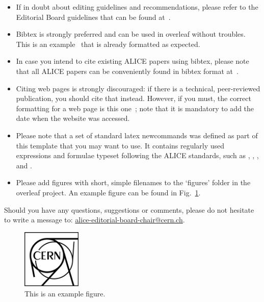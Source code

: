 \documentclass[ALICE,manyauthors]{cernphprep}
\begin{document}
\begin{itemize}
\item If in doubt about editing guidelines and recommendations, please refer to the Editorial Board guidelines that can be found at~\cite{EBGuidelineEditing}.
\item Bibtex is strongly preferred and can be used in overleaf without troubles. This is an example~\cite{Acharya:2018ckj} that is already formatted as expected.
\item In case you intend to cite existing ALICE papers using bibtex, please note that all ALICE papers can be conveniently found in bibtex format at~\cite{ALICEpubpapers}.
\item Citing web pages is strongly discouraged: if there is a technical, peer-reviewed publication, you should cite that instead. However, if you must, the correct formatting for a web page is this one~\cite{CERNpage}; note that it is mandatory to add the date when the website was accessed.  
\item Please note that a set of standard latex newcommands was defined as part of this template that you may want to use. It contains regularly used expressions and formulae typeset following the ALICE standards, such as \pt, \kzero, \fivenn,  and \avdndeta.
\item Please add figures with short, simple filenames to the `figures' folder in the overleaf project. An example figure can be found in Fig.~\ref{fig:example}. 
\end{itemize}

Should you have any questions, suggestions or comments, please do not hesitate to write a message to:  \href{mailto:alice-editorial-board-chair@cern.ch}{alice-editorial-board-chair@cern.ch}. 

\begin{figure}[tb]
    \begin{center}
    \includegraphics[width = 0.25\textwidth]{figures/example.pdf}
    \end{center}
    \caption{This is an example figure.}
    \label{fig:example}
\end{figure}
\end{document}
